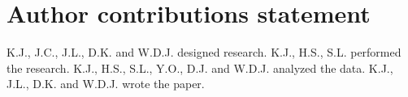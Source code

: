 \section*{Author contributions statement}

K.J., J.C., J.L., D.K. and W.D.J. designed research.
K.J., H.S., S.L. performed the research.
K.J., H.S., S.L., Y.O., D.J. and W.D.J. analyzed the data.
K.J., J.L., D.K. and W.D.J. wrote the paper.




  
  